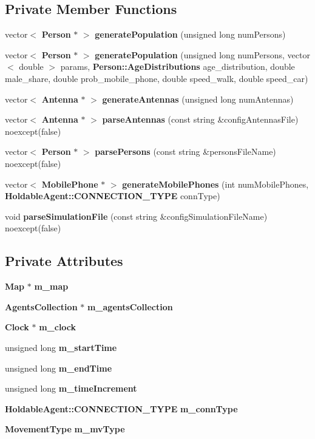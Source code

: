 \subsection*{Private Member Functions}
\begin{DoxyCompactItemize}
\item 
vector$<$ \textbf{ Person} $\ast$ $>$ \textbf{ generate\+Population} (unsigned long num\+Persons)
\item 
vector$<$ \textbf{ Person} $\ast$ $>$ \textbf{ generate\+Population} (unsigned long num\+Persons, vector$<$ double $>$ params, \textbf{ Person\+::\+Age\+Distributions} age\+\_\+distribution, double male\+\_\+share, double prob\+\_\+mobile\+\_\+phone, double speed\+\_\+walk, double speed\+\_\+car)
\item 
vector$<$ \textbf{ Antenna} $\ast$ $>$ \textbf{ generate\+Antennas} (unsigned long num\+Antennas)
\item 
vector$<$ \textbf{ Antenna} $\ast$ $>$ \textbf{ parse\+Antennas} (const string \&config\+Antennas\+File) noexcept(false)
\item 
vector$<$ \textbf{ Person} $\ast$ $>$ \textbf{ parse\+Persons} (const string \&persons\+File\+Name) noexcept(false)
\item 
vector$<$ \textbf{ Mobile\+Phone} $\ast$ $>$ \textbf{ generate\+Mobile\+Phones} (int num\+Mobile\+Phones, \textbf{ Holdable\+Agent\+::\+C\+O\+N\+N\+E\+C\+T\+I\+O\+N\+\_\+\+T\+Y\+PE} conn\+Type)
\item 
void \textbf{ parse\+Simulation\+File} (const string \&config\+Simulation\+File\+Name) noexcept(false)
\end{DoxyCompactItemize}
\subsection*{Private Attributes}
\begin{DoxyCompactItemize}
\item 
\textbf{ Map} $\ast$ \textbf{ m\+\_\+map}
\item 
\textbf{ Agents\+Collection} $\ast$ \textbf{ m\+\_\+agents\+Collection}
\item 
\textbf{ Clock} $\ast$ \textbf{ m\+\_\+clock}
\item 
unsigned long \textbf{ m\+\_\+start\+Time}
\item 
unsigned long \textbf{ m\+\_\+end\+Time}
\item 
unsigned long \textbf{ m\+\_\+time\+Increment}
\item 
\textbf{ Holdable\+Agent\+::\+C\+O\+N\+N\+E\+C\+T\+I\+O\+N\+\_\+\+T\+Y\+PE} \textbf{ m\+\_\+conn\+Type}
\item 
\textbf{ Movement\+Type} \textbf{ m\+\_\+mv\+Type}
\end{DoxyCompactItemize}


